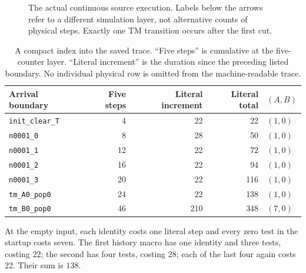 \documentclass[11pt,a4paper]{article}
\numberwithin{equation}{section}
\newcommand{\code}[1]{\texttt{\small #1}}
\begin{document}
\begin{figure}[htbp]
\centering
{}
\caption{The actual continuous source execution. Labels below the arrows
refer to a different simulation layer, not alternative counts of physical
steps. Exactly one TM transition occurs after the first cut.}
\end{figure}

\begin{table}[htbp]
\centering\small
\begin{tabular}{@{}lrrrl@{}}
\toprule
Arrival boundary & Five steps & Literal increment & Literal total & $(A,B)$\\
\midrule
\code{init\_clear\_T} & 4 & 22 & 22 & $(1,0)$\\
\code{n0001\_0} & 8 & 28 & 50 & $(1,0)$\\
\code{n0001\_1} & 12 & 22 & 72 & $(1,0)$\\
\code{n0001\_2} & 16 & 22 & 94 & $(1,0)$\\
\code{n0001\_3} & 20 & 22 & 116 & $(1,0)$\\
\code{tm\_A0\_pop0} & 24 & 22 & 138 & $(1,0)$\\
\code{tm\_B0\_pop0} & 46 & 210 & 348 & $(7,0)$\\
\bottomrule
\end{tabular}
\caption{A compact index into the saved trace. ``Five steps'' is cumulative
at the five-counter layer. ``Literal increment'' is the duration since the
preceding listed boundary. No individual physical row is omitted from the
machine-readable trace.}
\end{table}

At the empty input, each identity costs one literal step and every zero test
in the startup costs seven. The first history macro has one identity and
three tests, costing $22$; the second has four tests, costing $28$; each of
the last four again costs $22$. Their sum is $138$.
\end{document}
